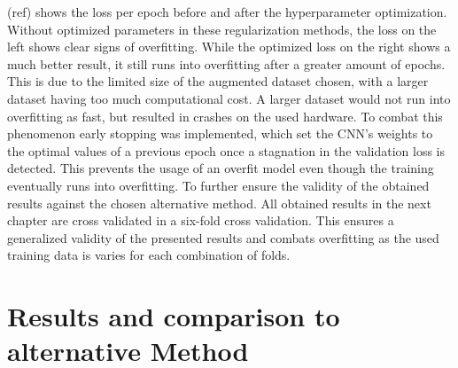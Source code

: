 (ref) shows the loss per epoch before and after the hyperparameter optimization. Without optimized parameters in these regularization methods, the loss on the left shows clear signs of overfitting. While the optimized loss on the right shows a much better result, it still runs into overfitting after a greater amount of epochs. This is due to the limited size of the augmented dataset chosen, with a larger dataset having too much computational cost. A larger dataset would not run into overfitting as fast, but resulted in crashes on the used hardware. To combat this phenomenon early stopping was implemented, which set the CNN's weights to the optimal values of a previous epoch once a stagnation in the validation loss is detected. This prevents the usage of an overfit model even though the training eventually runs into overfitting.
To further ensure the validity of the obtained results against the chosen alternative method. All obtained results in the next chapter are cross validated in a six-fold cross validation. This ensures a generalized validity of the presented results and combats overfitting as the used training data is varies for each combination of folds.
\section{Results and comparison to alternative Method}
    \label{sec:3}